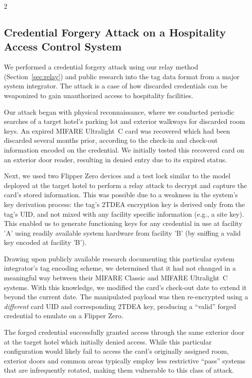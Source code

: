 \documentclass[10pt,letterpaper]{article}
\begin{document}
\begin{multicols}{2}
\subsection{Credential Forgery Attack on a Hospitality Access Control System}
We performed a credential forgery attack using our relay method (Section~\ref{sec:relay}) and public research into the tag data format from a major system integrator. The attack is a case of how discarded credentials can be weaponized to gain unauthorized access to hospitality facilities.

Our attack began with physical reconnaissance, where we conducted periodic searches of a target hotel's parking lot and exterior walkways for discarded room keys. An expired MIFARE Ultralight~C card was recovered which had been discarded several months prior, according to the check-in and check-out information encoded on the credential. We initially tested this recovered card on an exterior door reader, resulting in denied entry due to its expired status.

Next, we used two Flipper Zero devices and a test lock similar to the model deployed at the target hotel to perform a relay attack to decrypt and capture the card's stored information. This was possible due to a weakness in the system's key derivation process: the tag's 2TDEA encryption key is derived only from the tag's UID, and not mixed with any facility specific information (e.g., a site key). This enabled us to generate functioning keys for any credential in use at facility 'A' using readily available system hardware from facility 'B' (by sniffing a valid key encoded at facility 'B').

Drawing upon publicly available research documenting this particular system integrator's tag encoding scheme, we determined that it had not changed in a meaningful way between their MIFARE Classic and MIFARE Ultralight~C systems. With this knowledge, we modified the card's check-out date to extend it beyond the current date. The manipulated payload was then re-encrypted using a \textit{different} card UID and corresponding 2TDEA key, producing a ``valid'' forged credential to emulate on a Flipper Zero.

The forged credential successfully granted access through the same exterior door at the target hotel which initially denied access. While this particular configuration would likely fail to access the card's originally assigned room, exterior doors and common areas typically employ less restrictive ``pass'' systems that are infrequently rotated, making them vulnerable to this class of attack.


\end{multicols}
\end{document}
